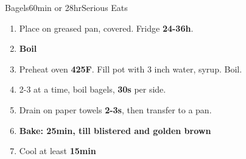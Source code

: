 \documentclass[]{mikescards}
\begin{document}
\begin{recipe}{Bagels}{60min or 28hr}{Serious Eats}
\begin{parcolumns}[colwidths={1=120pt}, rulebetween]{2}
{\begin{enumerate}
      \item Place on greased pan, covered. Fridge \textbf{24-36h}.
      \item \textbf{Boil}
      \item Preheat oven \textbf{425\textdegree F}. Fill pot with 3 inch water, syrup. Boil.  
      \item 2-3 at a time, boil bagels, \textbf{30s} per side.
      \item Drain on paper towels \textbf{2-3s}, then transfer to a pan.
      \item \textbf{Bake: 25min, till blistered and golden brown}
      \item Cool at least \textbf{15min}
    \end{enumerate}
  }
\end{parcolumns}

\end{recipe}
\end{document}
